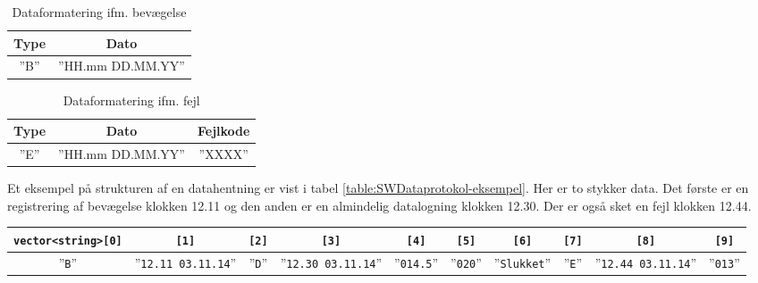 \begin{table}[h]
	\caption{Dataformatering ifm. bevægelse}
	\centering
	\begin{tabular}{|c|c|}
		\hline 
		\textbf{Type} & \textbf{Dato} \\ 
		\hline 
		''B'' & ''HH.mm DD.MM.YY'' \\ 
		\hline 
	\end{tabular} 
	\label{table:SWDataprotokol-bevaegelse}
\end{table}

\begin{table}[h]
	\caption{Dataformatering ifm. fejl}
	\centering
	\begin{tabular}{|c|c|c|}
		\hline 
		\textbf{Type} & \textbf{Dato} & \textbf{Fejlkode} \\ 
		\hline 
		''E'' & ''HH.mm DD.MM.YY'' & ''XXXX'' \\ 
		\hline 
	\end{tabular} 
	\label{table:SWDataprotokol-error}
\end{table}

Et eksempel på strukturen af en datahentning er vist i tabel \ref{table:SWDataprotokol-eksempel}. Her er to stykker data. Det første er en registrering af bevægelse klokken 12.11 og den anden er en almindelig datalogning klokken 12.30. Der er også sket en fejl klokken 12.44.

\begin{sidewaystable}[h]
	\caption{Dataformatering ifm. log-information}
	\centering
	\begin{tabular}{|c|c|c|c|c|c|c|c|c|c|}
		\hline
		\verb+vector<string>[0]+ & \verb+[1]+ & \verb+[2]+ & \verb+[3]+ & \verb+[4]+ & \verb+[5]+ & \verb+[6]+ & \verb+[7]+ & \verb+[8]+ & \verb+[9]+ \\
		\hline 
		''\verb+B+'' & ''\verb+12.11 03.11.14+'' & ''\verb+D+'' & ''\verb+12.30 03.11.14+'' & ''\verb+014.5+'' & ''\verb+020+'' & ''\verb+Slukket+'' & ''\verb+E+'' & ''\verb+12.44 03.11.14+'' & ''\verb+013+'' \\ 
		\hline 
	\end{tabular} 
	\label{table:SWDataprotokol-eksempel}
\end{sidewaystable}